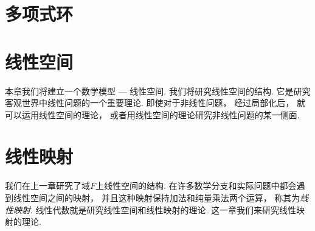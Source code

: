 \chapter{多项式环}













\chapter{线性空间}
本章我们将建立一个数学模型 --- 线性空间.
我们将研究线性空间的结构.
它是研究客观世界中线性问题的一个重要理论.
即使对于非线性问题，
经过局部化后，
就可以运用线性空间的理论，
或者用线性空间的理论研究非线性问题的某一侧面.






\chapter{线性映射}
我们在上一章研究了域\(F\)上线性空间的结构.
在许多数学分支和实际问题中都会遇到线性空间之间的映射，
并且这种映射保持加法和纯量乘法两个运算，
称其为\emph{线性映射}.
线性代数就是研究线性空间和线性映射的理论.
这一章我们来研究线性映射的理论.











